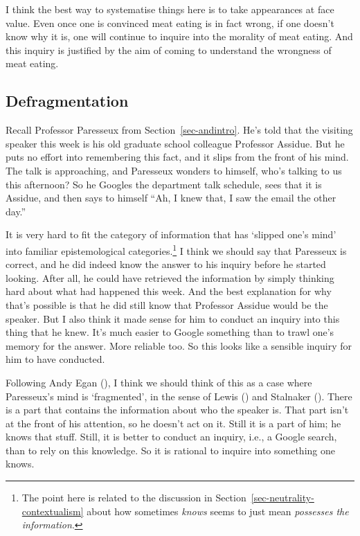 \documentclass[
  12pt,
  letterpaper,
]{scrbook}
\begin{document}
I think the best way to systematise things here is to take appearances
at face value. Even once one is convinced meat eating is in fact wrong,
if one doesn't know why it is, one will continue to inquire into the
morality of meat eating. And this inquiry is justified by the aim of
coming to understand the wrongness of meat eating.

\subsection{Defragmentation}\label{sec-defraginquiry}

Recall Professor Paresseux from Section~\ref{sec-andintro}. He's told
that the visiting speaker this week is his old graduate school colleague
Professor Assidue. But he puts no effort into remembering this fact, and
it slips from the front of his mind. The talk is approaching, and
Paresseux wonders to himself, who's talking to us this afternoon? So he
Googles the department talk schedule, sees that it is Assidue, and then
says to himself ``Ah, I knew that, I saw the email the other day.''

It is very hard to fit the category of information that has `slipped
one's mind' into familiar epistemological categories.\footnote{The point
  here is related to the discussion in
  Section~\ref{sec-neutrality-contextualism} about how sometimes
  \emph{knows} seems to just mean \emph{possesses the information}.} I
think we should say that Paresseux is correct, and he did indeed know
the answer to his inquiry before he started looking. After all, he could
have retrieved the information by simply thinking hard about what had
happened this week. And the best explanation for why that's possible is
that he did still know that Professor Assidue would be the speaker. But
I also think it made sense for him to conduct an inquiry into this thing
that he knew. It's much easier to Google something than to trawl one's
memory for the answer. More reliable too. So this looks like a sensible
inquiry for him to have conducted.

Following Andy Egan (), I think we should
think of this as a case where Paresseux's mind is `fragmented', in the
sense of Lewis () and Stalnaker
(). There is a part that contains the
information about who the speaker is. That part isn't at the front of
his attention, so he doesn't act on it. Still it is a part of him; he
knows that stuff. Still, it is better to conduct an inquiry, i.e., a
Google search, than to rely on this knowledge. So it is rational to
inquire into something one knows.
\end{document}
